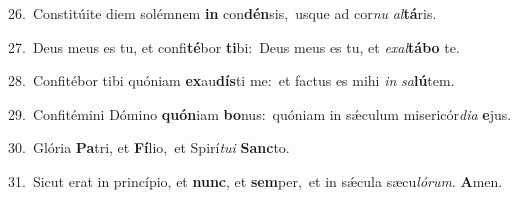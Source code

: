 {\numbfont\textcolor{\numbcolor}{26.}}~Constitúite diem solémnem \textbf{in} con\-\textbf{dén}\-sis,~\star usque ad cor\textit{nu} \textit{al}\-\textbf{tá}ris.\par
{\numbfont\textcolor{\numbcolor}{27.}}~Deus meus es tu, et confi\-\textbf{té}\-bor \textbf{ti}\-bi:~\star Deus meus es tu, et \textit{ex}\-\textit{al}\textbf{tá}\textbf{bo} te.\par
{\numbfont\textcolor{\numbcolor}{28.}}~Confitébor tibi quóniam \textbf{ex}\-au\-\textbf{dís}\-ti me:~\star et factus es mihi \textit{in} \textit{sa}\-\textbf{lú}tem.\par
{\numbfont\textcolor{\numbcolor}{29.}}~Confitémini Dómino \textbf{quón}\-iam \textbf{bo}\-nus:~\star quóniam in sǽculum misericór\-\textit{di}\-\textit{a} \textbf{e}\-jus.\par
{\numbfont\textcolor{\numbcolor}{30.}}~Glória \textbf{Pa}\-tri, et \textbf{Fí}\-lio,~\star et Spirí\-\textit{tu}\-\textit{i} \textbf{Sanc}\-to.\par
{\numbfont\textcolor{\numbcolor}{31.}}~Sicut erat in princípio, et \textbf{nunc}\-, et \textbf{sem}\-per,~\star et in sǽcula sæcu\-\textit{ló}\-\textit{rum}. \textbf{A}\-men.\par
